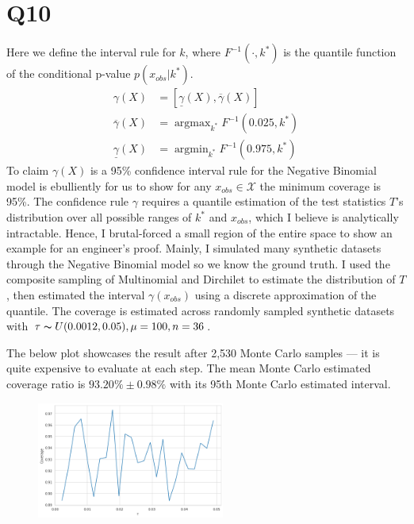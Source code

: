 \documentclass[11pt, letterpaper]{article}
\begin{document}
\section{Q10}
Here we define the interval rule for $k$, where $F^{-1}(\cdot, k^*)$ is the quantile function of the conditional p-value $p(x_{obs}|k^*)$.
\begin{align*}
    \gamma(X) &= [\underline{\gamma}(X), \overline{\gamma}(X)] \\
    \overline{\gamma}(X) &= \mathop{\arg\max}_{k^*} F^{-1}(0.025, k^*) \\
    \underline{\gamma}(X) &= \mathop{\arg\min}_{k^*} F^{-1}(0.975, k^*)
\end{align*}
To claim $\gamma(X)$ is a 95\% confidence interval rule for the Negative Binomial model is ebulliently for us to show for any $x_{obs} \in \mathscr{X}$ the minimum coverage is 95\%. The confidence rule $\gamma$ requires a quantile estimation of the test statistics $T$'s distribution over all possible ranges of $k^*$ and $x_{obs}$, which I believe is analytically intractable. Hence, I brutal-forced a small region of the entire space to show an example for an engineer's proof. Mainly, I simulated many synthetic datasets through the Negative Binomial model so we know the ground truth. I used the composite sampling of Multinomial and Dirchilet to estimate the distribution of $T$, then estimated the interval $\gamma(x_{obs})$ using a discrete approximation of the quantile. The coverage is estimated across randomly sampled synthetic datasets with $\tau \thicksim U(0.0012, 0.05), \mu=100, n=36$. 

The below plot showcases the result after 2,530 Monte Carlo samples --- it is quite expensive to evaluate at each step. The mean Monte Carlo estimated coverage ratio is $93.20\% \pm 0.98\%$ with its 95th Monte Carlo estimated interval. 

\begin{figure}[!h]
  \centering
  \includegraphics[width=0.55\textwidth]{midterm-2.png}
  \captionsetup{justification=centering}
\end{figure}
\end{document}
